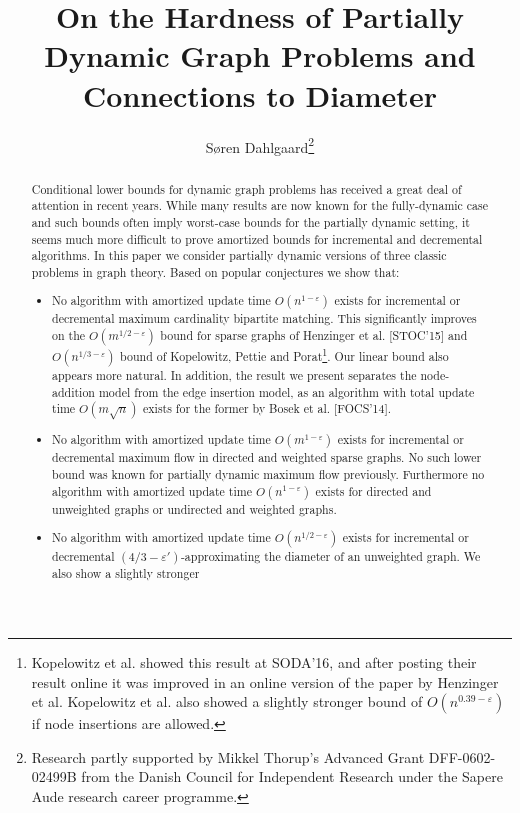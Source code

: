 \documentclass[a4paper,11pt]{article}
\title{On the Hardness of Partially Dynamic Graph Problems and Connections to
Diameter}
\author{Søren Dahlgaard\thanks{Research partly supported by Mikkel Thorup's
        Advanced Grant DFF-0602-02499B from the Danish Council for Independent
Research under the Sapere Aude research career programme.}}
\affil{University of Copenhagen\\\texttt{soerend@di.ku.dk}}
\date{}
\newcommand{\eps}{\varepsilon}
\theoremstyle{definition}
\begin{document}
\maketitle

\begin{abstract}
    Conditional lower bounds for dynamic graph problems has received a great
    deal of attention in recent years. While many results are now known for the
    fully-dynamic case and such bounds often imply worst-case bounds for the
    partially dynamic setting, it seems much more difficult to prove amortized
    bounds for incremental and decremental algorithms. In this paper we
    consider partially dynamic versions of three classic problems in graph
    theory. Based on popular conjectures we show that:
    \begin{itemize}
        \item No algorithm with amortized update time $O(n^{1-\eps})$ exists
            for incremental or decremental maximum cardinality bipartite
            matching. This significantly improves on the $O(m^{1/2-\eps})$
            bound for sparse graphs of Henzinger et al. [STOC'15] and
            $O(n^{1/3-\eps})$ bound of Kopelowitz, Pettie and
            Porat\footnote{Kopelowitz et al. showed this
                result at SODA'16, and after posting their result online it was
                improved in an online version of the paper by Henzinger et al.
                Kopelowitz et al. also showed a slightly stronger bound of
            $O(n^{0.39-\eps})$ if node insertions are allowed.}. Our linear
            bound also appears more natural.
            In addition, the result we present separates
            the node-addition model from the edge insertion model, as an
            algorithm with total update time $O(m\sqrt{n})$ exists for the
            former by Bosek et al. [FOCS'14].
        \item No algorithm with amortized update time $O(m^{1-\eps})$ exists
            for incremental or decremental maximum flow in directed and
            weighted sparse graphs. No such lower bound was known for
            partially dynamic maximum flow previously. Furthermore no algorithm
            with amortized update time $O(n^{1-\eps})$ exists for directed and
            unweighted graphs or undirected and weighted graphs.
        \item No algorithm with amortized update time $O(n^{1/2 - \eps})$
            exists for incremental or decremental $(4/3-\eps')$-approximating
            the diameter of an unweighted graph. We also show a slightly stronger

\end{itemize}
\end{abstract}
\end{document}
